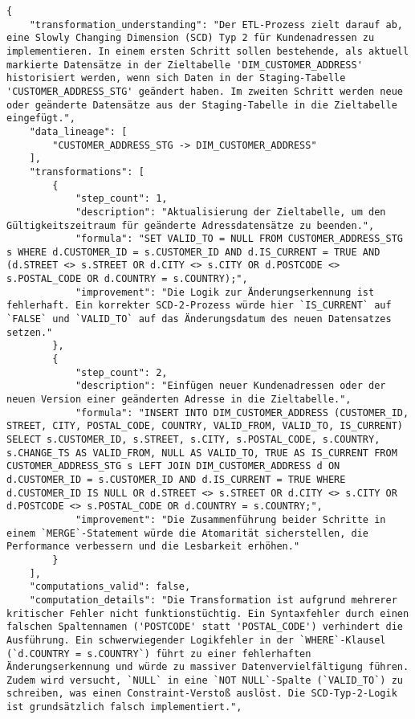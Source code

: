 \begin{lstlisting}[caption={Ausgabe: GEMINI 2.5 Pro Anwendungsfall 9 Konsistenzdurchlauf},label={gemini_case9_prompt2}]
{
    "transformation_understanding": "Der ETL-Prozess zielt darauf ab, eine Slowly Changing Dimension (SCD) Typ 2 für Kundenadressen zu implementieren. In einem ersten Schritt sollen bestehende, als aktuell markierte Datensätze in der Zieltabelle 'DIM_CUSTOMER_ADDRESS' historisiert werden, wenn sich Daten in der Staging-Tabelle 'CUSTOMER_ADDRESS_STG' geändert haben. Im zweiten Schritt werden neue oder geänderte Datensätze aus der Staging-Tabelle in die Zieltabelle eingefügt.",
    "data_lineage": [
        "CUSTOMER_ADDRESS_STG -> DIM_CUSTOMER_ADDRESS"
    ],
    "transformations": [
        {
            "step_count": 1,
            "description": "Aktualisierung der Zieltabelle, um den Gültigkeitszeitraum für geänderte Adressdatensätze zu beenden.",
            "formula": "SET VALID_TO = NULL FROM CUSTOMER_ADDRESS_STG s WHERE d.CUSTOMER_ID = s.CUSTOMER_ID AND d.IS_CURRENT = TRUE AND (d.STREET <> s.STREET OR d.CITY <> s.CITY OR d.POSTCODE <> s.POSTAL_CODE OR d.COUNTRY = s.COUNTRY);",
            "improvement": "Die Logik zur Änderungserkennung ist fehlerhaft. Ein korrekter SCD-2-Prozess würde hier `IS_CURRENT` auf `FALSE` und `VALID_TO` auf das Änderungsdatum des neuen Datensatzes setzen."
        },
        {
            "step_count": 2,
            "description": "Einfügen neuer Kundenadressen oder der neuen Version einer geänderten Adresse in die Zieltabelle.",
            "formula": "INSERT INTO DIM_CUSTOMER_ADDRESS (CUSTOMER_ID, STREET, CITY, POSTAL_CODE, COUNTRY, VALID_FROM, VALID_TO, IS_CURRENT) SELECT s.CUSTOMER_ID, s.STREET, s.CITY, s.POSTAL_CODE, s.COUNTRY, s.CHANGE_TS AS VALID_FROM, NULL AS VALID_TO, TRUE AS IS_CURRENT FROM CUSTOMER_ADDRESS_STG s LEFT JOIN DIM_CUSTOMER_ADDRESS d ON d.CUSTOMER_ID = s.CUSTOMER_ID AND d.IS_CURRENT = TRUE WHERE d.CUSTOMER_ID IS NULL OR d.STREET <> s.STREET OR d.CITY <> s.CITY OR d.POSTCODE <> s.POSTAL_CODE OR d.COUNTRY = s.COUNTRY;",
            "improvement": "Die Zusammenführung beider Schritte in einem `MERGE`-Statement würde die Atomarität sicherstellen, die Performance verbessern und die Lesbarkeit erhöhen."
        }
    ],
    "computations_valid": false,
    "computation_details": "Die Transformation ist aufgrund mehrerer kritischer Fehler nicht funktionstüchtig. Ein Syntaxfehler durch einen falschen Spaltennamen ('POSTCODE' statt 'POSTAL_CODE') verhindert die Ausführung. Ein schwerwiegender Logikfehler in der `WHERE`-Klausel (`d.COUNTRY = s.COUNTRY`) führt zu einer fehlerhaften Änderungserkennung und würde zu massiver Datenvervielfältigung führen. Zudem wird versucht, `NULL` in eine `NOT NULL`-Spalte (`VALID_TO`) zu schreiben, was einen Constraint-Verstoß auslöst. Die SCD-Typ-2-Logik ist grundsätzlich falsch implementiert.",

\end{lstlisting}
